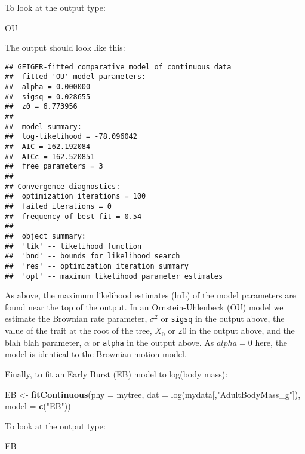 \documentclass[11pt]{article}
\newcommand{\KeywordTok}[1]{\textcolor[rgb]{0.13,0.29,0.53}{\textbf{{#1}}}}
\newcommand{\DataTypeTok}[1]{\textcolor[rgb]{0.13,0.29,0.53}{{#1}}}
\newcommand{\CharTok}[1]{\textcolor[rgb]{0.31,0.60,0.02}{{#1}}}
\newcommand{\StringTok}[1]{\textcolor[rgb]{0.31,0.60,0.02}{{#1}}}
\newcommand{\NormalTok}[1]{{#1}}
\begin{document}
To look at the output type:

\begin{snugshade}
\begin{Highlighting}[]
\NormalTok{OU}
\end{Highlighting}
\end{snugshade}

The output should look like this:

\begin{verbatim}
## GEIGER-fitted comparative model of continuous data
##  fitted 'OU' model parameters:
##  alpha = 0.000000
##  sigsq = 0.028655
##  z0 = 6.773956
## 
##  model summary:
##  log-likelihood = -78.096042
##  AIC = 162.192084
##  AICc = 162.520851
##  free parameters = 3
## 
## Convergence diagnostics:
##  optimization iterations = 100
##  failed iterations = 0
##  frequency of best fit = 0.54
## 
##  object summary:
##  'lik' -- likelihood function
##  'bnd' -- bounds for likelihood search
##  'res' -- optimization iteration summary
##  'opt' -- maximum likelihood parameter estimates
\end{verbatim}

As above, the maximum likelihood estimates (lnL) of the model parameters are found near the top of the output. In an Ornstein-Uhlenbeck (OU) model we estimate the Brownian rate parameter, $\sigma^2$ or \texttt{sigsq} in the output above, the value of the trait at the root of the tree, $X_0$ or \texttt{z$0$} in the output above, and the blah blah parameter, $\alpha$ or \texttt{alpha} in the output above. As $alpha = 0$ here, the model is identical to the Brownian motion model.

Finally, to fit an Early Burst (EB) model to log(body mass):

\begin{snugshade}
\begin{Highlighting}[]
\NormalTok{EB <-}\StringTok{ }\KeywordTok{fitContinuous}\NormalTok{(\DataTypeTok{phy = }mytree, \DataTypeTok{dat = }log(mydata[,"AdultBodyMass_g"]),} 
                    \DataTypeTok{model = }\KeywordTok{c}\NormalTok{(}\StringTok{"}\CharTok{EB}\StringTok{"}\NormalTok{))}
\end{Highlighting}
\end{snugshade}

To look at the output type:

\begin{snugshade}
\begin{Highlighting}[]
\NormalTok{EB}
\end{Highlighting}
\end{snugshade}
\end{document}
